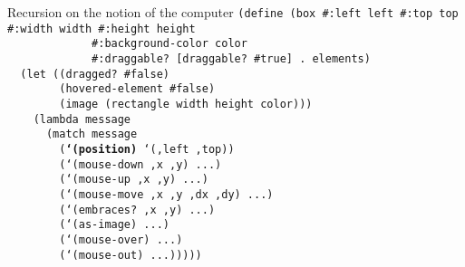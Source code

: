 \begin{frame}{Recursion on the notion of the computer}
  \tiny
  \texttt{(define (box \#:left left \#:top top \#:width width \#:height height\\
    \ \ \ \ \ \ \ \ \ \ \ \ \ \#:background-color color\\
    \ \ \ \ \ \ \ \ \ \ \ \ \ \#:draggable? [draggable? \#true] . elements)\\
    \ \ (let ((dragged? \#false)\\
    \ \ \ \ \ \ \ \ (hovered-element \#false)\\
    \ \ \ \ \ \ \ \ (image (rectangle width height color)))\\
    \ \ \ \ (lambda message\\
    \ \ \ \ \ \ (match message\\
    \ \ \ \ \ \ \ \ (\textbf{`(position)} `(,left ,top))\\
    \ \ \ \ \ \ \ \ (`(mouse-down ,x ,y) ...)\\
    \ \ \ \ \ \ \ \ (`(mouse-up ,x ,y) ...)\\
    \ \ \ \ \ \ \ \ (`(mouse-move ,x ,y ,dx ,dy) ...)\\
    \ \ \ \ \ \ \ \ (`(embraces? ,x ,y) ...)\\
    \ \ \ \ \ \ \ \ (`(as-image) ...)\\
    \ \ \ \ \ \ \ \ (`(mouse-over) ...)\\
    \ \ \ \ \ \ \ \ (`(mouse-out) ...)))))\\
    \ \\
    \ \\
    \ \\
    \ \\
    \ \\
    \ \\
    \ \\
    \ \\
    \ \\
    \ \\
    \ \\
    \ 
    }
\end{frame}

